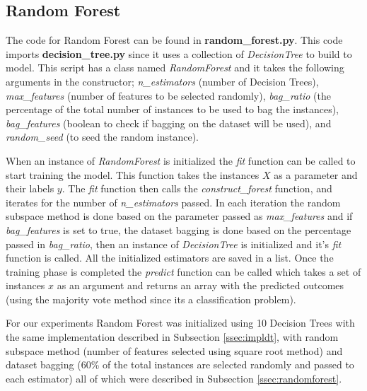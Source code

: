 \subsection{Random Forest}\label{ssec:implrf}
The code for Random Forest can be found in \textbf{random\_forest.py}. This code imports \textbf{decision\_tree.py} since it uses a collection of \textit{DecisionTree} to build to model. This script has a class named \textit{RandomForest} and it takes the following arguments in the constructor; \textit{n\_estimators} (number of Decision Trees), \textit{max\_features} (number of features to be selected randomly), \textit{bag\_ratio} (the percentage of the total number of instances to be used to bag the instances), \textit{bag\_features} (boolean to check if bagging on the dataset will be used), and \textit{random\_seed} (to seed the random instance). 

\noindent When an instance of \textit{RandomForest} is initialized the \textit{fit} function can be called to start training the model. This function takes the instances $X$ as a parameter and their labels $y$. The \textit{fit} function then calls the \textit{construct\_forest} function, and iterates for the number of \textit{n\_estimators} passed. In each iteration the random subspace method is done based on the parameter passed as \textit{max\_features} and if \textit{bag\_features} is set to true, the dataset bagging is done based on the percentage passed in \textit{bag\_ratio}, then an instance of \textit{DecisionTree} is initialized and it's \textit{fit} function is called. All the initialized estimators are saved in a list. Once the training phase is completed the \textit{predict} function can be called which takes a set of instances $x$ as an argument and returns an array with the predicted outcomes (using the majority vote method since its a classification problem). 

\noindent For our experiments Random Forest was initialized using 10 Decision Trees with the same implementation described in Subsection  \ref{ssec:impldt},  with random subspace method (number of features selected using square root method) and dataset bagging (60\% of the total instances are selected randomly and passed to each estimator) all of which were described in Subsection \ref{ssec:randomforest}.